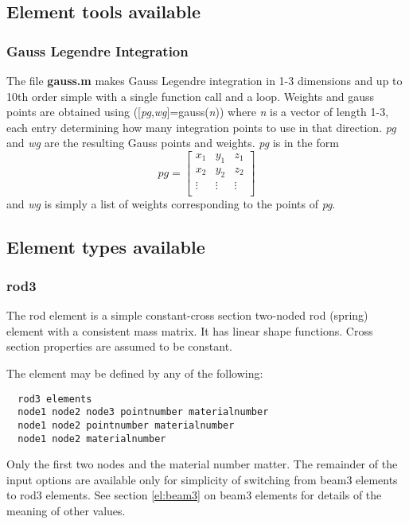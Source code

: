 \documentclass[12pt]{article}
\newcommand*{\sarg}[1]{\textit{#1}}
\newcommand*{\command}[1]{\textsf{#1}}
\newcommand*{\filename}[1]{\textsf{\textbf{#1}}}
\begin{document}
\subsection{Element tools available}
\subsubsection{Gauss Legendre Integration}
The file \filename{gauss.m} makes Gauss Legendre integration in 1-3
dimensions and up to 10th order simple with a single function call and
a loop. Weights and gauss points are obtained using
\command{([}\sarg{pg}\command{,}\sarg{wg}\command{]=gauss(}\sarg{n}\command{))}
where \sarg{n} is a vector of length 1-3, each entry determining how
many integration points to use in that direction. \sarg{pg} and
\sarg{wg} are the resulting Gauss points and weights. \sarg{pg} is in
the form
\begin{displaymath}
pg=\begin{bmatrix}
x_{1}&y_{1}&z_{1}\\
x_{2}&y_{2}&z_{2}\\
\vdots&\vdots&\vdots\\
\end{bmatrix}
\end{displaymath}and \sarg{wg} is simply a list of weights corresponding to the points of \sarg{pg}.
\subsection{Element types available}

\subsubsection{\command{rod3}}\label{el:rod3}
The \command{rod} element is a simple constant-cross section two-noded rod (spring) element with a consistent mass matrix.  It has linear shape functions. Cross section properties are assumed to be constant.

The element may be defined by any of the following:\\
\begin{lstlisting}
  rod3 elements 
  node1 node2 node3 pointnumber materialnumber 
  node1 node2 pointnumber materialnumber 
  node1 node2 materialnumber
\end{lstlisting}
Only the first two nodes and the material number matter. The remainder of the input options are available only for simplicity of switching from \command{beam3} elements to \command{rod3} elements. See section \ref{el:beam3} on \command{beam3} elements for details of the meaning of other values.
\end{document}
